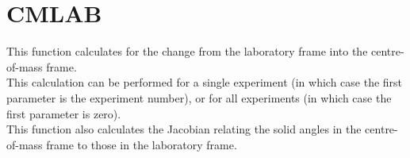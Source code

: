 \section{CMLAB}
\label{sect:cmlab}

\noindent This function calculates for the change from the laboratory frame
into the centre-of-mass frame.\\

\noindent This calculation can be performed for a single experiment (in
which case the first parameter is the experiment number), or for all
experiments (in which case the first parameter is zero).\\

\noindent This function also calculates the Jacobian relating the solid
angles in the centre-of-mass frame to those in the laboratory frame.\\
